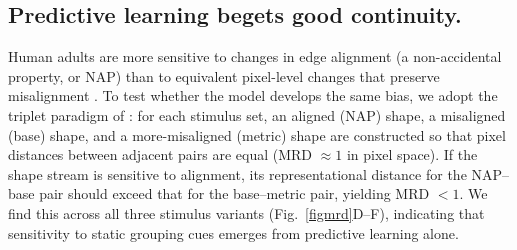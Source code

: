 \documentclass{ccn}  %
\newcommand{\TS}[1]{\textcolor{magenta}{[TS: #1]}}
\begin{document}






\subsection*{Predictive learning begets good continuity.}

Human adults are more sensitive to changes in edge alignment (a non-accidental property, or NAP) than to equivalent pixel-level changes that preserve misalignment \citep{kim2012greater}. To test whether the model develops the same bias, we adopt the triplet paradigm of \citep{kim2012greater}: for each stimulus set, an aligned (NAP) shape, a misaligned (base) shape, and a more-misaligned (metric) shape are constructed so that pixel distances between adjacent pairs are equal (MRD $\approx 1$ in pixel space). If the shape stream is sensitive to alignment, its representational distance for the NAP--base pair should exceed that for the base--metric pair, yielding MRD $ < 1$. We find this across all three stimulus variants (Fig.~\ref{figmrd}D--F), indicating that sensitivity to static grouping cues emerges from predictive learning alone. 
\end{document}
